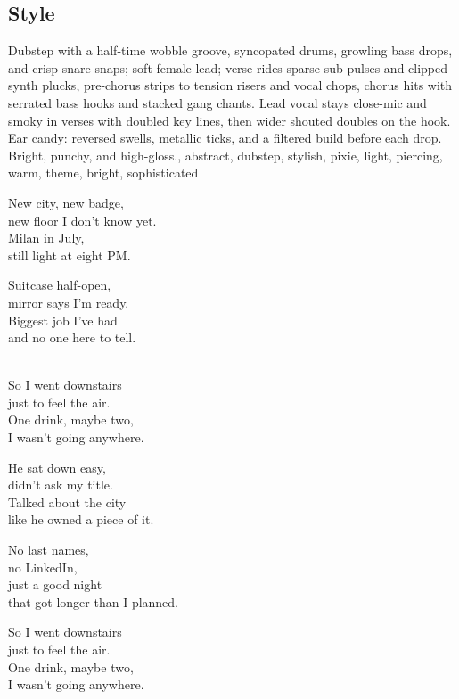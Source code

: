 \subsection{Style}
Dubstep with a half-time wobble groove, syncopated drums, growling bass drops, and crisp snare snaps; soft female lead; verse rides sparse sub pulses and clipped synth plucks, pre-chorus strips to tension risers and vocal chops, chorus hits with serrated bass hooks and stacked gang chants. Lead vocal stays close-mic and smoky in verses with doubled key lines, then wider shouted doubles on the hook. Ear candy: reversed swells, metallic ticks, and a filtered build before each drop. Bright, punchy, and high-gloss., abstract, dubstep, stylish, pixie, light, piercing, warm, theme, bright, sophisticated

\begin{lyrics}

New city, new badge,\\
new floor I don't know yet.\\
Milan in July,\\
still light at eight PM.

Suitcase half-open,\\
mirror says I'm ready.\\
Biggest job I've had\\
and no one here to tell.

\\
So I went downstairs\\
just to feel the air.\\
One drink, maybe two,\\
I wasn't going anywhere.

He sat down easy,\\
didn't ask my title.\\
Talked about the city\\
like he owned a piece of it.

No last names,\\
no LinkedIn,\\
just a good night\\
that got longer than I planned.

So I went downstairs\\
just to feel the air.\\
One drink, maybe two,\\
I wasn't going anywhere.


\end{lyrics}
